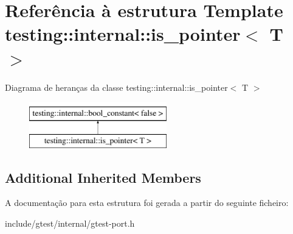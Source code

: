 \hypertarget{structtesting_1_1internal_1_1is__pointer}{\section{Referência à estrutura Template testing\-:\-:internal\-:\-:is\-\_\-pointer$<$ T $>$}
\label{structtesting_1_1internal_1_1is__pointer}
}
Diagrama de heranças da classe testing\-:\-:internal\-:\-:is\-\_\-pointer$<$ T $>$\begin{figure}[H]
\begin{center}
\leavevmode
\includegraphics[height=2.000000cm]{structtesting_1_1internal_1_1is__pointer}
\end{center}
\end{figure}
\subsection*{Additional Inherited Members}


A documentação para esta estrutura foi gerada a partir do seguinte ficheiro\-:\begin{DoxyCompactItemize}
\item 
include/gtest/internal/gtest-\/port.\-h\end{DoxyCompactItemize}
